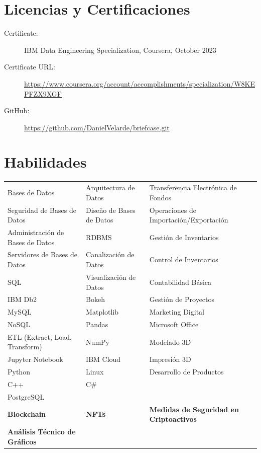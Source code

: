\documentclass[a4paper,10pt]{article}
\begin{document}
\section*{Licencias y Certificaciones}

\begin{description}
    \item[Certificate:] IBM Data Engineering Specialization, Coursera, October 2023
    \item[Certificate URL:] \url{https://www.coursera.org/account/accomplishments/specialization/W8KEPFZX9XGF}
\end{description}

\vspace{1pt} %

\begin{description}
    \item[GitHub:] \url{https://github.com/DanielVelarde/briefcase.git}
\end{description}

\section*{Habilidades}
\begin{tabular}{p{4.5cm}p{4.5cm}p{4.5cm}}
    Bases de Datos & Arquitectura de Datos & Transferencia Electrónica de Fondos \\
    Seguridad de Bases de Datos & Diseño de Bases de Datos & Operaciones de Importación/Exportación \\
    Administración de Bases de Datos & RDBMS & Gestión de Inventarios \\
    Servidores de Bases de Datos & Canalización de Datos & Control de Inventarios \\
    SQL & Visualización de Datos & Contabilidad Básica \\
    IBM Db2 & Bokeh & Gestión de Proyectos \\
    MySQL & Matplotlib & Marketing Digital \\
    NoSQL & Pandas & Microsoft Office \\
    ETL (Extract, Load, Transform) & NumPy & Modelado 3D \\
    Jupyter Notebook & IBM Cloud & Impresión 3D \\
    Python & Linux & Desarrollo de Productos \\
    C++ & C\# & \\
    PostgreSQL & & \\
    \textbf{Blockchain} & \textbf{NFTs} & \textbf{Medidas de Seguridad en Criptoactivos} \\
    \textbf{Análisis Técnico de Gráficos} & & \\
\end{tabular}
\end{document}
